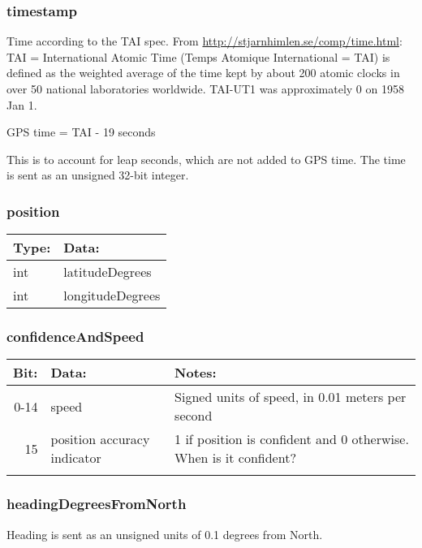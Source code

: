 \documentclass[11pt]{article}
\begin{document}
\subsubsection{timestamp}
\label{sec:orgheadline5}
Time according to the TAI spec. From
\url{http://stjarnhimlen.se/comp/time.html}:
TAI = International Atomic Time (Temps Atomique International = TAI) is
     defined as the weighted average of the time kept by about 200
     atomic clocks in over 50 national laboratories worldwide.
     TAI-UT1 was approximately 0 on 1958 Jan 1.

GPS time = TAI - 19 seconds

This is to account for leap seconds, which are not added to GPS time.
The time is sent as an unsigned 32-bit integer.

\subsubsection{position}
\label{sec:orgheadline6}
\begin{center}
\begin{tabular}{ll}
\hline
Type: & Data:\\
\hline
int & latitudeDegrees\\
int & longitudeDegrees\\
\end{tabular}
\end{center}

\subsubsection{confidenceAndSpeed}
\label{sec:orgheadline7}
\begin{center}
\begin{tabular}{rll}
\hline
Bit: & Data: & Notes:\\
\hline
0-14 & speed & Signed units of speed, in 0.01 meters per second\\
15 & position accuracy indicator & 1 if position is confident and 0 otherwise. When is it confident?\\
 &  & \\
\end{tabular}
\end{center}

\subsubsection{headingDegreesFromNorth}
\label{sec:orgheadline8}
Heading is sent as an unsigned units of 0.1 degrees from North.
\end{document}

